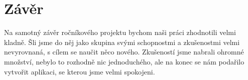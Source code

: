 \section{Závěr}

Na samotný závěr ročníkového projektu bychom naši práci zhodnotili velmi kladně. 
Šli jsme do něj jako skupina svými schopnostmi a zkušenostmi velmi nevyrovnaná,
s cílem se naučit něco nového. Zkušeností jsme nabrali ohromné množství, nebylo
to rozhodně nic jednoduchého, ale na konec se nám podařilo vytvořit aplikaci, se kterou
jsme velmi spokojeni. 